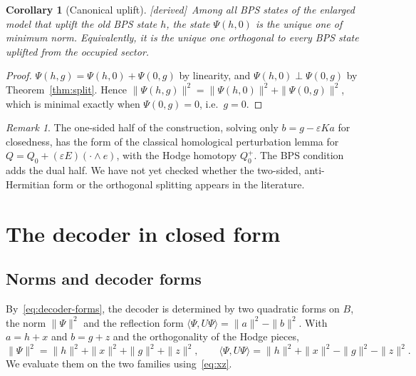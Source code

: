 \documentclass[11pt]{article}
\newcommand{\ip}[2]{\langle #1,#2\rangle}
\newcommand{\eps}{\varepsilon}
\newcommand{\tagbox}[2]{\textsf{\small\color{#1}[#2]}}
\newcommand{\DER}{\tagbox{cder}{derived}}
\theoremstyle{plain}
\newtheorem{corollary}{Corollary}
\theoremstyle{remark}
\newtheorem*{remark}{Remark}
\numberwithin{equation}{section}
\begin{document}
\begin{corollary}[Canonical uplift]\label{cor:minnorm}\DER\
Among all BPS states of the enlarged model that uplift the old BPS state $h$, the state $\Psi(h,0)$ is the unique one of
minimum norm. Equivalently, it is the unique one orthogonal to every BPS state uplifted from the occupied sector.
\end{corollary}

\begin{proof}
$\Psi(h,g)=\Psi(h,0)+\Psi(0,g)$ by linearity, and $\Psi(h,0)\perp\Psi(0,g)$ by Theorem~\ref{thm:split}. Hence
$\|\Psi(h,g)\|^2=\|\Psi(h,0)\|^2+\|\Psi(0,g)\|^2$, which is minimal exactly when $\Psi(0,g)=0$, i.e.\ $g=0$.
\end{proof}

\begin{remark}
The one-sided half of the construction, solving only $b=g-\eps Ka$ for closedness, has the form of the classical
homological perturbation lemma for $Q=Q_0+(\eps E)(\cdot\wedge e)$, with the Hodge homotopy $Q_0^+$. The BPS condition
adds the dual half. We have not yet checked whether the two-sided, anti-Hermitian form or the orthogonal splitting
appears in the literature.
\end{remark}

\section{The decoder in closed form}\label{sec:decoder}

\subsection{Norms and decoder forms}

By~\eqref{eq:decoder-forms}, the decoder is determined by two quadratic forms on $B$, the norm $\|\Psi\|^2$ and the
reflection form $\ip{\Psi}{U\Psi}=\|a\|^2-\|b\|^2$. With $a=h+x$ and $b=g+z$ and the orthogonality of the Hodge pieces,
\begin{equation}\label{eq:forms}
\|\Psi\|^2=\|h\|^2+\|x\|^2+\|g\|^2+\|z\|^2,\qquad
\ip{\Psi}{U\Psi}=\|h\|^2+\|x\|^2-\|g\|^2-\|z\|^2 .
\end{equation}
We evaluate them on the two families using~\eqref{eq:xz}.
\end{document}
